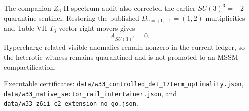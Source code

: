 The companion \(Z_6\)-II spectrum audit also corrected the earlier
\(SU(3)^3=-2\) quarantine sentinel.  Restoring the published
\(D_{\gamma=+1,-1}=(1,2)\) multiplicities and Table-VII \(T_3\) vector right
movers gives
\[
\boxed{A_{SU(3)^3}=0}.
\]
Hypercharge-related visible anomalies remain nonzero in the current ledger,
so the heterotic witness remains quarantined and is not promoted to an MSSM
compactification.

Executable certificates:
\texttt{data/w33\_controlled\_det\_17term\_optimality.json},
\texttt{data/w33\_native\_sector\_rail\_intertwiner.json}, and
\texttt{data/w33\_z6ii\_c2\_extension\_no\_go.json}.

